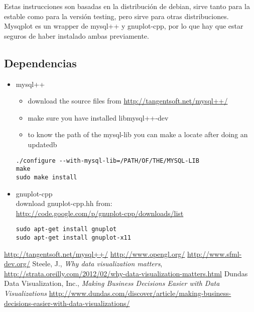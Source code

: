 \documentclass[a4paper]{article}
\begin{document}
Estas instrucciones son basadas en la distribución de debian, sirve tanto para la estable como para la versión testing, pero sirve para otras distribuciones. Mysqplot es un wrapper de mysql++ y gnuplot-cpp, por lo que hay que estar seguros de haber instalado ambas previamente. 

\subsection*{Dependencias}
\begin{itemize}
\item mysql++
\begin{itemize}
\item download the source files from \url{http://tangentsoft.net/mysql++/}
\item make sure you have installed libmysql++-dev
\item to know the path of the mysql-lib you can make a locate after doing an updatedb
\end{itemize}
\begin{lstlisting}
./configure --with-mysql-lib=/PATH/OF/THE/MYSQL-LIB
make
sudo make install
\end{lstlisting}
\item gnuplot-cpp\\
download gnuplot-cpp.hh from:\\ \url{http://code.google.com/p/gnuplot-cpp/downloads/list}
\begin{lstlisting}
sudo apt-get install gnuplot
sudo apt-get install gnuplot-x11
\end{lstlisting}
\end{itemize}



\begin{thebibliography}{10}
\url{http://tangentsoft.net/mysql++/}
\url{http://www.opengl.org/}
\url{http://www.sfml-dev.org/}
Steele, J., \textit{Why data visualization matters}, 
		\url{http://strata.oreilly.com/2012/02/why-data-visualization-matters.html}
Dundas Data Visualization, Inc., \textit{Making Business Decisions Easier with Data Visualizations}
		\url{http://www.dundas.com/discover/article/making-business-decisions-easier-with-data-visualizations/}
\end{thebibliography}

\end{document}
